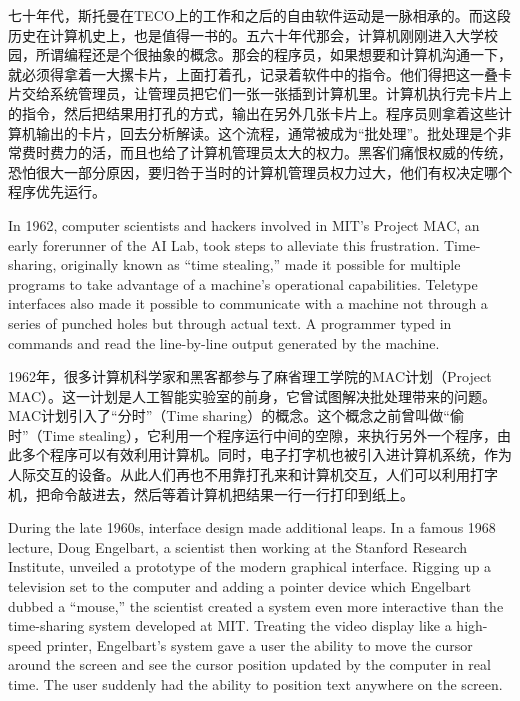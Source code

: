 \ifdefined\chs
七十年代，斯托曼在TECO上的工作和之后的自由软件运动是一脉相承的。而这段历史在计算机史上，也是值得一书的。五六十年代那会，计算机刚刚进入大学校园，所谓编程还是个很抽象的概念。那会的程序员，如果想要和计算机沟通一下，就必须得拿着一大摞卡片，上面打着孔，记录着软件中的指令。他们得把这一叠卡片交给系统管理员，让管理员把它们一张一张插到计算机里。计算机执行完卡片上的指令，然后把结果用打孔的方式，输出在另外几张卡片上。程序员则拿着这些计算机输出的卡片，回去分析解读。这个流程，通常被成为``批处理''。批处理是个非常费时费力的活，而且也给了计算机管理员太大的权力。黑客们痛恨权威的传统，恐怕很大一部分原因，要归咎于当时的计算机管理员权力过大，他们有权决定哪个程序优先运行。
\fi

\ifdefined\eng
In 1962, computer scientists and hackers involved in MIT's Project MAC, an early forerunner of the AI Lab, took steps to alleviate this frustration. Time-sharing, originally known as ``time stealing,'' made it possible for multiple programs to take advantage of a machine's operational capabilities. Teletype interfaces also made it possible to communicate with a machine not through a series of punched holes but through actual text. A programmer typed in commands and read the line-by-line output generated by the machine.
\fi

\ifdefined\chs
1962年，很多计算机科学家和黑客都参与了麻省理工学院的MAC计划（Project MAC）。这一计划是人工智能实验室的前身，它曾试图解决批处理带来的问题。MAC计划引入了``分时''（Time sharing）的概念。这个概念之前曾叫做``偷时''（Time stealing），它利用一个程序运行中间的空隙，来执行另外一个程序，由此多个程序可以有效利用计算机。同时，电子打字机也被引入进计算机系统，作为人际交互的设备。从此人们再也不用靠打孔来和计算机交互，人们可以利用打字机，把命令敲进去，然后等着计算机把结果一行一行打印到纸上。
\fi

\ifdefined\eng
During the late 1960s, interface design made additional leaps. In a famous 1968 lecture, Doug Engelbart, a scientist then working at the Stanford Research Institute, unveiled a prototype of the modern graphical interface. Rigging up a television set to the computer and adding a pointer device which Engelbart dubbed a ``mouse,'' the scientist created a system even more interactive than the time-sharing system developed at MIT. Treating the video display like a high-speed printer, Engelbart's system gave a user the ability to move the cursor around the screen and see the cursor position updated by the computer in real time. The user suddenly had the ability to position text anywhere on the screen.
\fi

